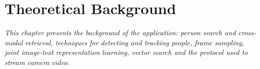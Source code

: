 \chapter{Theoretical Background}
\label{chapter:lythuyet}

\textit{This chapter presents the background of the application: person search and cross-modal retrieval, techniques for detecting and tracking people, frame sampling, joint image-text representation learning, vector search and the protocol used to stream camera video.}








